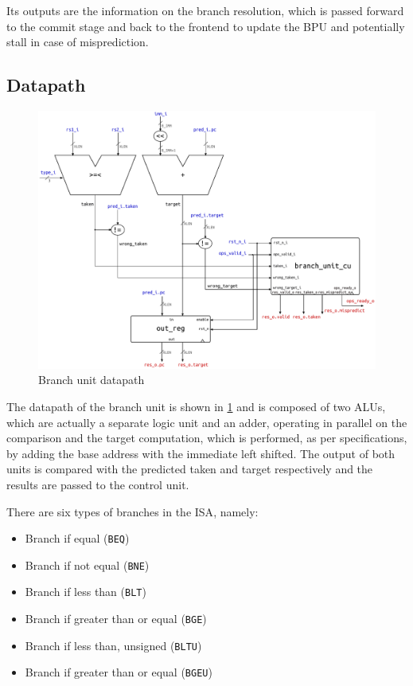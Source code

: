 Its outputs are the information on the branch resolution, which is passed forward to the commit stage and back to the frontend to update the \ac{BPU} and potentially stall in case of misprediction.

\subsection{Datapath}
\begin{figure}[hbt]
  \centering
  \includegraphics[width=\textwidth]{img/branch_unit.pdf}
  \caption{Branch unit datapath}
  \label{fig:branch_unit}
\end{figure}
The datapath of the branch unit is shown in \cref{fig:branch_unit} and is composed of two ALUs, which are actually a separate logic unit and an adder, operating in parallel on the comparison and the target computation, which is performed, as per \riscv specifications, by adding the base address with the immediate left shifted. The output of both units is compared with the predicted taken and target respectively and the results are passed to the control unit.

There are six types of branches in the \riscv \ac{ISA}, namely:
\begin{itemize}
  \item Branch if equal (\texttt{BEQ})
  \item Branch if not equal (\texttt{BNE})
  \item Branch if less than (\texttt{BLT})
  \item Branch if greater than or equal (\texttt{BGE})
  \item Branch if less than, unsigned (\texttt{BLTU})
  \item Branch if greater than or equal (\texttt{BGEU})
\end{itemize}

